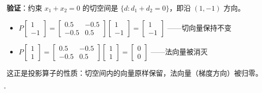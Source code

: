 {\textbf{验证}：约束 $x_1+x_2=0$ 的切空间是 $\{d: d_1+d_2=0\}$，即沿 $(1,-1)$ 方向。
\begin{itemize}
  \item $P \begin{bmatrix}1\\-1\end{bmatrix} = \begin{bmatrix}0.5&-0.5\\-0.5&0.5\end{bmatrix}\begin{bmatrix}1\\-1\end{bmatrix} = \begin{bmatrix}1\\-1\end{bmatrix}$ ——切向量保持不变
  \item $P \begin{bmatrix}1\\1\end{bmatrix} = \begin{bmatrix}0.5&-0.5\\-0.5&0.5\end{bmatrix}\begin{bmatrix}1\\1\end{bmatrix} = \begin{bmatrix}0\\0\end{bmatrix}$ ——法向量被消灭
\end{itemize}
这正是投影算子的性质：切空间内的向量原样保留，法向量（梯度方向）被归零。}

\r{}



